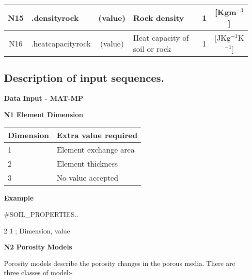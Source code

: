 \begin{table}[htbp]
\begin{center}
\begin{tabular}{|c|l|c|l|c|c|}
N15&.densityrock&(value)&Rock density&1&[Kgm$^{-3}$]\\

\hline

N16&.heatcapacityrock&(value)&Heat capacity of soil or rock &1&[JKg$^{-1}$K$^{-1}$]\\


\hline

\end{tabular}
\end{center}
\end{table}

\normalsize
\newpage

\subsection{Description of input sequences.}

\textbf{Data Input - MAT-MP}

\vspace{0.5cm}

\textbf{N1  Element Dimension}
\begin{center}
\begin{tabular}{l|l}
%
Dimension & Extra value required \\
\hline
1 & Element exchange area \\
2 & Element thickness \\
3 & No value accepted
\end{tabular}

\end{center}


\vspace{0.5cm}

\vspace{0.5cm}

\textbf{Example}
\newline

\#SOIL\_PROPERTIES..

 2 1 ; Dimension, value

\vspace{0.5cm}

\textbf{N2  Porosity Models}

Porosity models describe the porosity changes in the porous media.
There are three classes of model:-

